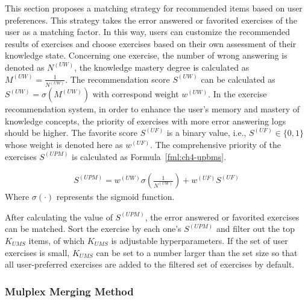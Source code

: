
This section proposes a matching strategy for recommended items based on user preferences. This strategy takes the error answered or favorited exercises of the user as a matching factor. In this way, users can customize the recommended results of exercises and choose exercises based on their own assessment of their knowledge state. Concerning one exercise, the number of wrong answering is denoted as \(N^{(UW)}\), the knowledge mastery degree is calculated as \(M^{(UW)}=\frac{1}{N^{(UW)}}\). The recommendation score \(S^{(UW)}\) can be calculated as \(S^{(UW)}=\sigma(M^{(UW)}) \)  with correspond weight \(w^{(UW)}\). In the exercise recommendation system, in order to enhance the user's memory and mastery of knowledge concepts, the priority of exercises with more error answering logs should be higher. The favorite score \(S^{(UF)}\) is a binary value, i.e., \(S^{(UF)}\in \{0,1\} \) whose weight is denoted here as \(w^{(UF)}\). The comprehensive priority of the exercises \(S^{(UPM)}\) is calculated as Formula~\ref{fml:ch4-upbms}.

\begin{align}
  S^{(UPM)} = w^{(UW)}\sigma({\frac{1}{N^{(UW)}}}) + w^{(UF)}S^{(UF)} \label{fml:ch4-upbms}
\end{align}
Where \(\sigma(\cdot)\) represents the sigmoid function.

After calculating the value of \(S^{(UPM)}\), the error answered or favorited exercises can be matched. Sort the exercise by each one's \(S^{(UPM)}\) and filter out the top \(K_{UMS}\) items, of which \(K_{UMS}\) is adjustable hyperparameters. If the set of user exercises is small, \(K_{UMS}\) can be set to a number larger than the set size so that all user-preferred exercises are added to the filtered set of exercises by default.

\subsubsection{Mulplex Merging Method}

